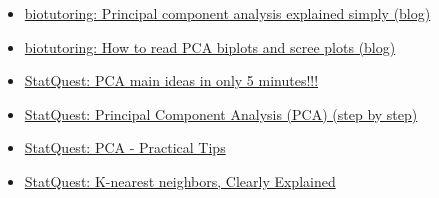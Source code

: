\documentclass[12pt, titlepage, french]{report}
\begin{document}
\begin{YTB_vids}
\begin{itemize}
	\item	\href{https://blog.bioturing.com/2018/06/14/principal-component-analysis-explained-simply/}{biotutoring: Principal component analysis explained simply (blog)}
	\item	\href{https://blog.bioturing.com/2018/06/18/how-to-read-pca-biplots-and-scree-plots/}{biotutoring: How to read PCA biplots and scree plots (blog)}
	\item	\href{https://www.youtube.com/watch?v=HMOI_lkzW08&list=PLblh5JKOoLUICTaGLRoHQDuF_7q2GfuJF&index=23}{StatQuest: PCA main ideas in only 5 minutes!!!}
	\item	\href{https://www.youtube.com/watch?v=FgakZw6K1QQ}{StatQuest: Principal Component Analysis (PCA) (step by step)}
	\item	\href{https://www.youtube.com/watch?v=oRvgq966yZg&list=PLblh5JKOoLUICTaGLRoHQDuF_7q2GfuJF&index=24}{StatQuest: PCA - Practical Tips}
	\item	\href{https://www.youtube.com/watch?v=HVXime0nQeI&list=PLblh5JKOoLUICTaGLRoHQDuF_7q2GfuJF&index=33}{StatQuest: K-nearest neighbors, Clearly Explained}
\end{itemize}
\end{YTB_vids}
\end{document}
